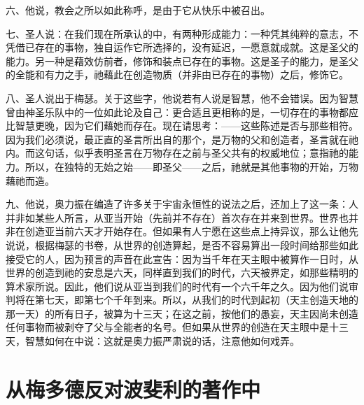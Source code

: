 六、他说，教会之所以如此称呼，是由于它从快乐中被召出。\par

七、圣人说：在我们现在所承认的中，有两种形成能力：一种凭其纯粹的意志，不凭借已存在的事物，独自运作它所选择的，没有延迟，一愿意就成就。这是圣父的能力。另一种是藉效仿前者，修饰和装点已存在的事物。这是圣子的能力，是圣父的全能和有力之手，祂藉此在创造物质（并非由已存在的事物）之后，修饰它。\par

八、圣人说出于梅瑟。关于这些字，他说若有人说是智慧，他不会错误。因为智慧曾由神圣乐队中的一位如此论及自己：更合适且更相称的是，一切存在的事物都应比智慧更晚，因为它们藉她而存在。现在请思考：——这些陈述是否与那些相符。因为我们必须说，最正直的圣言所出自的那个，是万物的父和创造者，圣言就在祂内。而这句话，似乎表明圣言在万物存在之前与圣父共有的权威地位；意指祂的能力。所以，在独特的无始之始——即圣父——之后，祂就是其他事物的开始，万物藉祂而造。\par

九、他说，奥力振在编造了许多关于宇宙永恒性的说法之后，还加上了这一条：人并非如某些人所言，从亚当开始（先前并不存在）首次存在并来到世界。世界也并非在创造亚当前六天才开始存在。但如果有人宁愿在这些点上持异议，那么让他先说说，根据梅瑟的书卷，从世界的创造算起，是否不容易算出一段时间给那些如此接受它的人，因为预言的声音在此宣告：因为当千年在天主眼中被算作一日时，从世界的创造到祂的安息是六天，同样直到我们的时代，六天被界定，如那些精明的算术家所说。因此，他们说从亚当到我们的时代有一个六千年之久。因为他们说审判将在第七天，即第七个千年到来。所以，从我们的时代到起初（天主创造天地的那一天）的所有日子，被算为十三天；在这之前，按他们的愚妄，天主因尚未创造任何事物而被剥夺了父与全能者的名号。但如果从世界的创造在天主眼中是十三天，智慧如何在中说：这就是奥力振严肃说的话，注意他如何戏弄。\par


\section{从梅多德反对波斐利的著作中}

